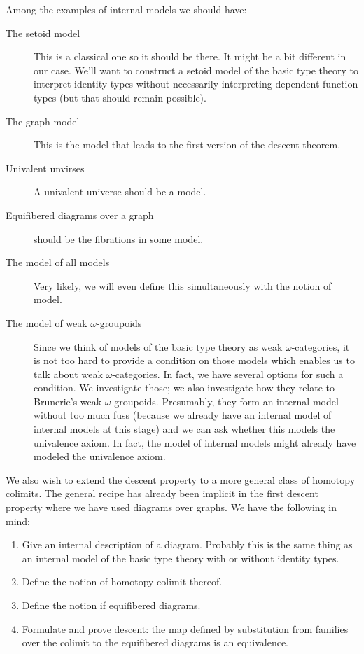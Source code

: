 Among the examples of internal models we should have:
\begin{description}
\item[The setoid model] This is a classical one so it should be there. It might
      be a bit different in our case. We'll want to construct a setoid model
      of the basic type theory to interpret identity types without necessarily
      interpreting dependent function types (but that should remain possible).
\item[The graph model] This is the model that leads to the first version of the
      descent theorem.
\item[Univalent unvirses] A univalent universe should be a model.
\item[Equifibered diagrams over a graph] should be the fibrations in some model.
\item[The model of all models] Very likely, we will even define this simultaneously
      with the notion of model.
\item[The model of weak $\omega$-groupoids] Since we think of models of the
      basic type theory as weak $\omega$-categories, it is not too hard to
      provide a condition on those models which enables us to talk about
      weak $\omega$-categories. In fact, we have several options for such a
      condition. We investigate those; we also investigate how they relate to
      Brunerie's weak $\omega$-groupoids. Presumably, they form an internal
      model without too much fuss (because we already have an internal model
      of internal models at this stage) and we can ask whether this models
      the univalence axiom. In fact, the model of internal models might already
      have modeled the univalence axiom. 
\end{description}

We also wish to extend the descent property to a more general class of homotopy
colimits. The general recipe has already been implicit in the first descent
property where we have used diagrams over graphs. We have the following in mind:
\begin{enumerate}
\item Give an internal description of a diagram. Probably this is the same thing
      as an internal model of the basic type theory with or without identity types.
\item Define the notion of homotopy colimit thereof.
\item Define the notion if equifibered diagrams.
\item Formulate and prove descent: the map defined by substitution
 from families over the colimit to the equifibered diagrams is an equivalence.
\end{enumerate}

